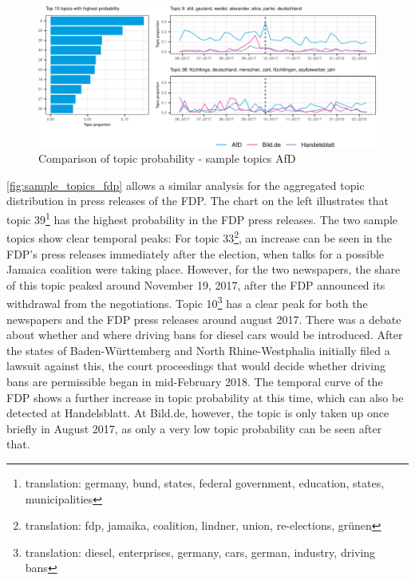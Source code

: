 \documentclass[
  12pt,
]{article}
\begin{document}
\begin{figure}

{\centering \includegraphics[width=1\linewidth]{chap1_files/figure-latex/Top AfD topics-1} 

}

\caption{Comparison of topic probability - sample topics AfD \label{fig:sample_topics_afd}}\label{fig:Top AfD topics}
\end{figure}

\autoref{fig:sample_topics_fdp} allows a similar analysis for the
aggregated topic distribution in press releases of the FDP. The chart on
the left illustrates that topic 39\footnote{translation: germany, bund,
  states, federal government, education, states, municipalities} has the
highest probability in the FDP press releases. The two sample topics
show clear temporal peaks: For topic 33\footnote{translation: fdp,
  jamaika, coalition, lindner, union, re-elections, grünen}, an increase
can be seen in the FDP's press releases immediately after the election,
when talks for a possible Jamaica coalition were taking place. However,
for the two newspapers, the share of this topic peaked around November
19, 2017, after the FDP announced its withdrawal from the negotiations.
Topic 10\footnote{translation: diesel, enterprises, germany, cars,
  german, industry, driving bans} has a clear peak for both the
newspapers and the FDP press releases around august 2017. There was a
debate about whether and where driving bans for diesel cars would be
introduced. After the states of Baden-Württemberg and North
Rhine-Westphalia initially filed a lawsuit against this, the court
proceedings that would decide whether driving bans are permissible began
in mid-February 2018. The temporal curve of the FDP shows a further
increase in topic probability at this time, which can also be detected
at Handelsblatt. At Bild.de, however, the topic is only taken up once
briefly in August 2017, as only a very low topic probability can be seen
after that.
\end{document}
